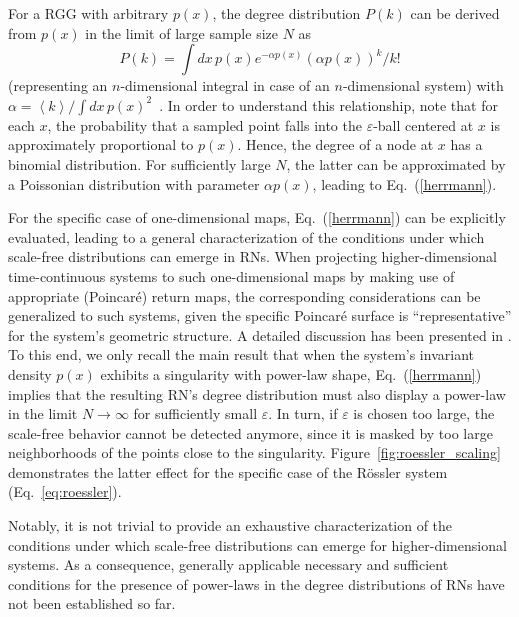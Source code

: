 For a RGG with arbitrary $p(x)$, the degree distribution $P(k)$ can be derived from $p(x)$ in the limit of large sample size $N$ as
\begin{equation}\label{herrmann}
  P(k) = \int dx\,p(x) e^{-\alpha p(x)}(\alpha p(x))^k/k!
\end{equation}
(representing an $n$-dimensional integral in case of an $n$-dimensional system) with $\alpha = \left<k\right> / \int dx\,p(x)^2$~\cite{Herrmann2003}. In order to understand this relationship, note that for each $x$, the probability that a sampled point falls into the $\varepsilon$-ball centered at $x$ is approximately proportional to $p(x)$. Hence, the degree of a node at $x$ has a binomial distribution. For sufficiently large $N$, the latter can be approximated by a Poissonian distribution with parameter $\alpha p(x)$, leading to Eq.~(\ref{herrmann}).

For the specific case of one-dimensional maps, Eq.~(\ref{herrmann}) can be explicitly evaluated, leading to a general characterization of the conditions under which scale-free distributions can emerge in RNs. When projecting higher-dimensional time-continuous systems to such one-dimensional maps by making use of appropriate (Poincar\'e) return maps, the corresponding considerations can be generalized to such systems, given the specific Poincar\'e surface is ``representative'' for the system's geometric structure. A detailed discussion has been presented in \cite{Zou2012EPL}. To this end,  we only recall the main result that when the system's invariant density $p(x)$ exhibits a singularity with power-law shape, Eq.~(\ref{herrmann}) implies that the resulting RN's degree distribution must also display a power-law in the limit $N\to\infty$ for sufficiently small $\varepsilon$. In turn, if $\varepsilon$ is chosen too large, the scale-free behavior cannot be detected anymore, since it is masked by too large neighborhoods of the points close to the singularity. Figure~\ref{fig:roessler_scaling} demonstrates the latter effect for the specific case of the R\"ossler system (Eq.~\ref{eq:roessler}).

Notably, it is not trivial to provide an exhaustive characterization of the conditions under which scale-free distributions can emerge for higher-dimensional systems. As a consequence, generally applicable necessary and sufficient conditions for the presence of power-laws in the degree distributions of RNs have not been established so far.

